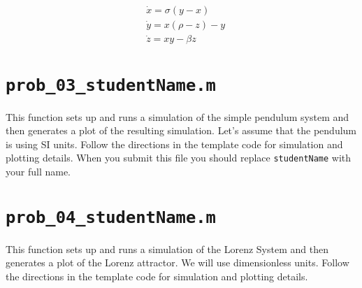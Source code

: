 \begin{align}
  &  \dot{x} = \sigma (y-x) \\
  &  \dot{y} = x (\rho - z) - y \\
  &  \dot{z} = x y - \beta z
\end{align}



\pagebreak
\section*{\texttt{prob\_03\_studentName.m}}

This function sets up and runs a simulation of the simple pendulum system and then generates a plot
of the resulting simulation. Let's assume that the pendulum is using SI units.
Follow the directions in the template code for simulation and plotting details.
When you submit this file you should replace \texttt{studentName} with your full name.



\pagebreak
\section*{\texttt{prob\_04\_studentName.m}}

This function sets up and runs a simulation of the Lorenz System and then generates a plot of the
Lorenz attractor. We will use dimensionless units.
Follow the directions in the template code for simulation and plotting details.



\pagebreak


